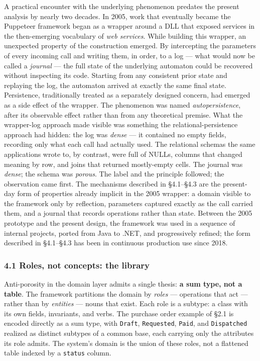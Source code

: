 \documentclass[
]{article}
\let\origtexttt\texttt%
\renewcommand{\texttt}[1]{\origtexttt{\seqsplit{#1}}}%
\let\texttt\origtexttt%
\begin{document}
A practical encounter with the underlying phenomenon predates the
present analysis by nearly two decades. In 2005, work that eventually
became the Puppeteer framework began as a wrapper around a DLL that
exposed services in the then-emerging vocabulary of \emph{web services}.
While building this wrapper, an unexpected property of the construction
emerged. By intercepting the parameters of every incoming call and
writing them, in order, to a log --- what would now be called a
\emph{journal} --- the full state of the underlying automaton could be
recovered without inspecting its code. Starting from any consistent
prior state and replaying the log, the automaton arrived at exactly the
same final state. Persistence, traditionally treated as a separately
designed concern, had emerged as a side effect of the wrapper. The
phenomenon was named \emph{autopersistence}, after its observable effect
rather than from any theoretical premise. What the wrapper-log approach
made visible was something the relational-persistence approach had
hidden: the log was \emph{dense} --- it contained no empty fields,
recording only what each call had actually used. The relational schemas
the same applications wrote to, by contrast, were full of NULLs, columns
that changed meaning by row, and joins that returned mostly-empty cells.
The journal was \emph{dense}; the schema was \emph{porous}. The label
and the principle followed; the observation came first. The mechanisms
described in §4.1--§4.3 are the present-day form of properties already
implicit in the 2005 wrapper: a domain visible to the framework only by
reflection, parameters captured exactly as the call carried them, and a
journal that records operations rather than state. Between the 2005
prototype and the present design, the framework was used in a sequence
of internal projects, ported from Java to .NET, and progressively
refined; the form described in §4.1--§4.3 has been in continuous
production use since 2018.

\subsubsection{4.1 Roles, not concepts: the
library}\label{roles-not-concepts-the-library}

Anti-porosity in the domain layer admits a single thesis: \textbf{a sum
type, not a table}. The framework partitions the domain by \emph{roles}
--- operations that act --- rather than by \emph{entities} --- nouns
that exist. Each role is a subtype: a class with its own fields,
invariants, and verbs. The purchase order example of §2.1 is encoded
directly as a sum type, with \texttt{Draft}, \texttt{Requested},
\texttt{Paid}, and \texttt{Dispatched} realized as distinct subtypes of
a common base, each carrying only the attributes its role admits. The
system's domain is the union of these roles, not a flattened table
indexed by a \texttt{status} column.
\end{document}
